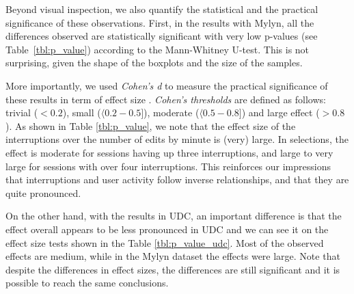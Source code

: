 \documentclass[times]{smrauth}
\begin{document}
Beyond visual inspection, we also quantify the statistical and the practical significance of these observations. First, in the results with Mylyn, all the differences observed are statistically significant with very low p-values (see Table~\ref{tbl:p_value}) according to the Mann-Whitney U-test. This is not surprising, given the shape of the boxplots and the size of the samples.

More importantly, we used \textit{Cohen's d} to measure the practical significance of these results in term of effect size %
\cite{C94}. \textit{Cohen's thresholds} are defined as follows: trivial ($<0.2$), small  ($\langle 0.2 - 0.5 ]$), moderate ($\langle 0.5 - 0.8 ]$) and large effect ($> 0.8$). As shown in Table \ref{tbl:p_value}, we note that the effect size of the interruptions over the number of edits by minute is (very) large. In selections, the effect is moderate for sessions having up three interruptions, and large to very large for sessions with over four interruptions. This reinforces our impressions that interruptions and user activity follow inverse relationships, and that they are quite pronounced.

On the other hand, with the results in UDC, an important difference is that the effect overall appears to be less pronounced in UDC and we can see it on the effect size tests shown in the Table \ref{tbl:p_value_udc}. Most of the observed effects are medium, while in the Mylyn dataset the effects were large. Note that despite the differences in effect sizes, the differences are still significant and it is possible to reach the same conclusions.

\end{document}

